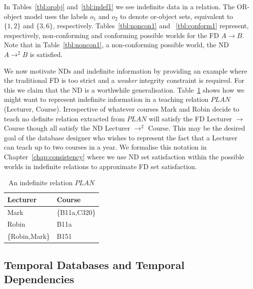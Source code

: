 In Tables~\ref{tbl:orobj} and~\ref{tbl:indef1} we see indefinite data
in a relation. The OR-object model uses the labels $o_1$ and $o_2$ to
denote or-object sets, equivalent to $\{1,2\}$ and $\{3,6\}$,
respectively. Tables~\ref{tbl:noncon1} and ~\ref{tbl:conform1}
represent, respectively, non-conforming and conforming possible worlds
for the FD $A \to B$. Note that in Table~\ref{tbl:noncon1}, a non-conforming
possible world, the ND $A \to^2 B$ is satisfied.

\medskip
{}
We now motivate NDs and indefinite information by providing an example
where
the traditional FD is too strict and a {\em weaker} integrity constraint
is required. For this we claim that the ND is a worthwhile generalisation.
Table~\ref{tbl:lc} shows how we might
want to represent indefinite information in a teaching relation 
$PLAN$(Lecturer, Course).  Irrespective of whatever courses Mark and Robin
 decide to teach no definite relation extracted from $PLAN$
will satisfy the FD Lecturer $\to$ Course though all satisfy the 
ND Lecturer $\to^2$ Course. This may be the desired goal of the 
database designer who wishes to represent the fact that a Lecturer can
teach up to two courses in a year. We formalise this notation in
Chapter~\ref{chap:consistency} where we use ND set satisfaction within
the possible worlds in indefinite relations to approximate FD set satisfaction.

{\line
\begin{table}[ht]
\begin{center}
\begin{tabular}{||l|l||} \hline
Lecturer & Course \\ \hline
 Mark & \{B11a,C320\} \\
 Robin & B11a \\
 \{Robin,Mark\} & B151 \\ \hline
\end{tabular}
\end{center}
\caption{\label{tbl:lc} An indefinite relation $PLAN$} 
\end{table}
}


\subsection{Temporal Databases and Temporal Dependencies}\label{subsec:temdat}

